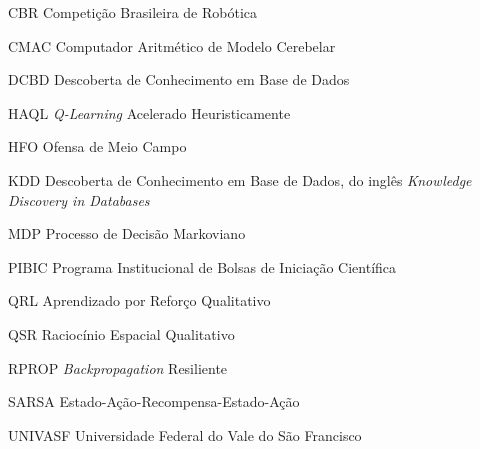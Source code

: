 \begin{KeepFromToc} %
\listoffigures
\cleardoublepage


\listoftables
\cleardoublepage

\makeatletter
\let\l@listing\l@figure
\def\newfloat@listoflisting@hook{\let\figurename\listingname}
\makeatother

\listoflistings

\end{KeepFromToc}

\begin{siglas}
	\item[CBR] Competição Brasileira de Robótica
    \item[CMAC] Computador Aritmético de Modelo Cerebelar
    \item[DCBD] Descoberta de Conhecimento em Base de Dados 
    \item[HAQL] \textit{Q-Learning} Acelerado Heuristicamente
    \item[HFO] Ofensa de Meio Campo
    \item[KDD] Descoberta de Conhecimento em Base de Dados, do inglês \textit{Knowledge Discovery in Databases}
    \item[MDP] Processo de Decisão Markoviano
    \item[PIBIC] Programa Institucional de Bolsas de Iniciação Científica 
    \item[QRL] Aprendizado por Reforço Qualitativo
    \item[QSR] Raciocínio Espacial Qualitativo
    \item[RPROP] \textit{Backpropagation} Resiliente
    \item[SARSA] Estado-Ação-Recompensa-Estado-Ação
    \item[UNIVASF] Universidade Federal do Vale do São Francisco
	    
\end{siglas}

\tableofcontents*
\cleardoublepage
